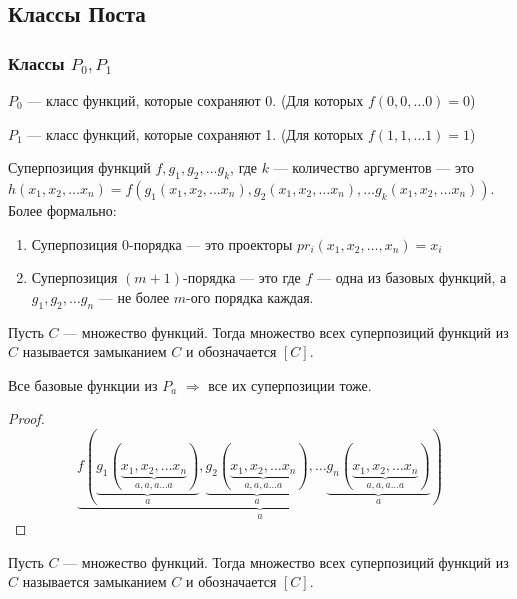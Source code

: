 \subsection{Классы Поста}

\subsubsection{Классы \(P_0, P_1\)}
\begin{definition}
    $P_0$ --- класс функций, которые сохраняют 0. (Для которых $f(0, 0, \dots 0) = 0$)
\end{definition}
\begin{definition}
    $P_1$ --- класс функций, которые сохраняют 1. (Для которых $f(1, 1, \dots 1) = 1$)
\end{definition}


\begin{definition}
    Суперпозиция функций $f, g_1, g_2, \dots g_k$, где $k$ --- количество аргументов --- это $h(x_1, x_2, \dots x_n) = f(g_1(x_1, x_2, \dots x_n), g_2(x_1, x_2, \dots x_n), \dots g_k(x_1, x_2, \dots x_n))$. Более формально:
    \begin{enumerate}
        \item Суперпозиция 0-порядка --- это проекторы $pr_i(x_1, x_2, \dots, x_n) = x_i$
        \item Суперпозиция $(m+1)$-порядка --- это где $f$ --- одна из базовых функций, а $g_1, g_2, \dots g_n$ --- не более $m$-ого порядка каждая.
    \end{enumerate}
\end{definition}

\begin{definition}
    Пусть $C$ --- множество функций. Тогда множество всех суперпозиций функций из $C$ называется замыканием $C$ и обозначается $[C]$.
\end{definition}

\begin{theorem}
    Все базовые функции из $P_a$ $\Rightarrow$ все их суперпозиции тоже.
\end{theorem}
\begin{proof}
    $$\underbrace{f(\underbrace{g_1(\underbrace{x_1, x_2, \dots x_n}_{a, a, a\dots a})}_{a}, \underbrace{g_2(\underbrace{x_1, x_2, \dots x_n}_{a, a, a\dots a})}_{a}, \dots \underbrace{g_n(\underbrace{x_1, x_2, \dots x_n}_{a, a, a\dots a})}_{a})}_{a}$$
\end{proof}

\begin{definition}
    Пусть $C$ --- множество функций. Тогда множество всех суперпозиций функций из $C$ называется замыканием $C$ и обозначается $[C]$.
\end{definition}

